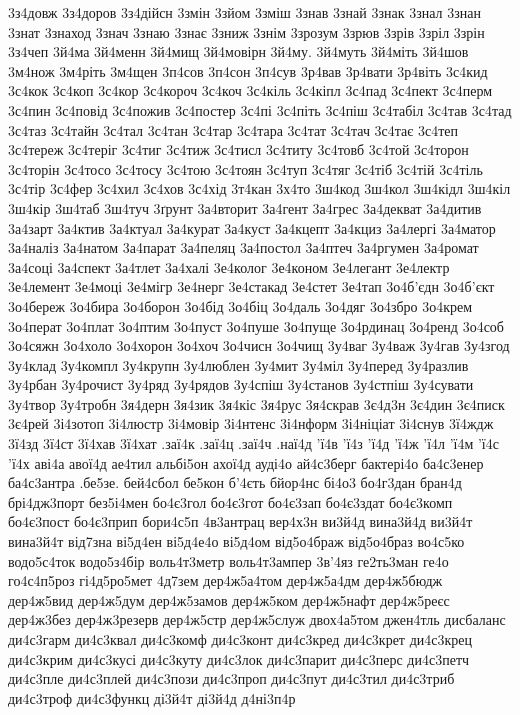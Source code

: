 {3з4довж
3з4доров
3з4дійсн
3змін
3зйом
3зміш
3знав
3знай
3знак
3знал
3знан
3знат
3знаход
3знач
3знаю
3знає
3зниж
3знім
3зрозум
3зрюв
3зрів
3зріл
3зрін
3з4чеп
3й4ма
3й4менн
3й4мищ
3й4мовірн
3й4му.
3й4муть
3й4міть
3й4шов
3м4нож
3м4ріть
3м4щен
3п4сов
3п4сон
3п4сув
3р4вав
3р4вати
3р4віть
3с4кид
3с4кок
3с4коп
3с4кор
3с4короч
3с4коч
3с4кіль
3с4кіпл
3с4пад
3с4пект
3с4перм
3с4пин
3с4повід
3с4пожив
3с4постер
3с4пі
3с4піть
3с4піш
3с4табіл
3с4тав
3с4тад
3с4таз
3с4тайн
3с4тал
3с4тан
3с4тар
3с4тара
3с4тат
3с4тач
3с4тає
3с4теп
3с4тереж
3с4теріг
3с4тиг
3с4тиж
3с4тисл
3с4титу
3с4товб
3с4той
3с4торон
3с4торін
3с4тосо
3с4тосу
3с4тою
3с4тоян
3с4туп
3с4тяг
3с4тіб
3с4тій
3с4тіль
3с4тір
3с4фер
3с4хил
3с4хов
3с4хід
3т4кан
3х4то
3ш4код
3ш4кол
3ш4кідл
3ш4кіл
3ш4кір
3ш4таб
3ш4туч
3ґрунт
3а4вторит
3а4гент
3а4грес
3а4декват
3а4дитив
3а4зарт
3а4ктив
3а4ктуал
3а4курат
3а4куст
3а4кцепт
3а4кциз
3а4лергі
3а4матор
3а4наліз
3а4натом
3а4парат
3а4пеляц
3а4постол
3а4птеч
3а4ргумен
3а4ромат
3а4соці
3а4спект
3а4тлет
3а4халі
3е4колог
3е4коном
3е4легант
3е4лектр
3е4лемент
3е4моці
3е4мігр
3е4нерг
3е4стакад
3е4стет
3е4тап
3о4б'єдн
3о4б'єкт
3о4береж
3о4бира
3о4борон
3о4бід
3о4біц
3о4даль
3о4дяг
3о4збро
3о4крем
3о4перат
3о4плат
3о4птим
3о4пуст
3о4пуше
3о4пуще
3о4рдинац
3о4ренд
3о4соб
3о4сяжн
3о4холо
3о4хорон
3о4хоч
3о4чисн
3о4чищ
3у4ваг
3у4важ
3у4гав
3у4згод
3у4клад
3у4компл
3у4крупн
3у4люблен
3у4мит
3у4міл
3у4перед
3у4разлив
3у4рбан
3у4рочист
3у4ряд
3у4рядов
3у4спіш
3у4станов
3у4стпіш
3у4сувати
3у4твор
3у4тробн
3я4дерн
3я4зик
3я4кіс
3я4рус
3я4скрав
3є4д3н
3є4дин
3є4писк
3є4рей
3і4зотоп
3і4люстр
3і4мовір
3і4нтенс
3і4нформ
3і4ніціат
3і4снув
3ї4ждж
3ї4зд
3ї4ст
3ї4хав
3ї4хат
.заї4к
.заї4ц
.заї4ч
.наї4д
'ї4в
'ї4з
'ї4д
'ї4ж
'ї4л
'ї4м
'ї4с
'ї4х
аві4а
авої4д
ае4тил
альбі5он
ахої4д
ауді4о
ай4с3берг
бактері4о
ба4с3енер
ба4с3антра
.бе5зе.
бей4сбол
бе5кон
б'4єть
бйор4нс
бі4о3
бо4г3дан
бран4д
брі4дж3порт
без5і4мен
бо4є3гол
бо4є3гот
бо4є3зап
бо4є3здат
бо4є3комп
бо4є3пост
бо4є3прип
бори4с5п
4в3антрац
вер4х3н
ви3й4д
вина3й4д
ви3й4т
вина3й4т
від7зна
ві5д4ен
ві5д4е4о
ві5д4ом
від5о4браж
від5о4браз
во4с5ко
водо5с4ток
водо5з4бір
воль4т3метр
воль4т3ампер
3в'4яз
ге2ть3ман
ге4о
го4с4п5роз
гі4д5ро5мет
4д7зем
дер4ж5а4том
дер4ж5а4дм
дер4ж5бюдж
дер4ж5вид
дер4ж5дум
дер4ж5замов
дер4ж5ком
дер4ж5нафт
дер4ж5реєс
дер4ж3без
дер4ж3резерв
дер4ж5стр
дер4ж5служ
двох4а5том
джен4тль
дисбаланс
ди4с3гарм
ди4с3квал
ди4с3комф
ди4с3конт
ди4с3кред
ди4с3крет
ди4с3крец
ди4с3крим
ди4с3кусі
ди4с3куту
ди4с3лок
ди4с3парит
ди4с3перс
ди4с3петч
ди4с3пле
ди4с3плей
ди4с3пози
ди4с3проп
ди4с3пут
ди4с3тил
ди4с3триб
ди4с3троф
ди4с3функц
ді3й4т
ді3й4д
д4ні3п4р
}
